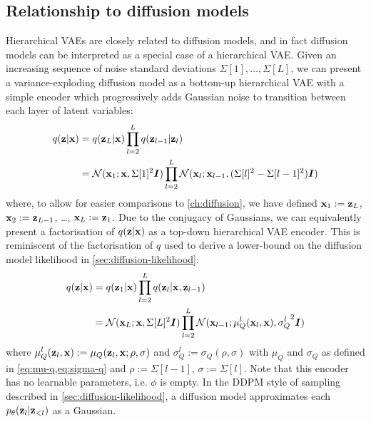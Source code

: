 \subsection{Relationship to diffusion models}
Hierarchical VAEs are closely related to diffusion models, and in fact diffusion models can be interpreted as a special case of a hierarchical VAE. Given an increasing sequence of noise standard deviations $\Sigma[1],\ldots,\Sigma[L]$, we can present a variance-exploding diffusion model as a bottom-up hierarchical VAE with a simple encoder which progressively adds Gaussian noise to transition between each layer of latent variables:
\begin{align}
    q({\mathbf{z}}|{\mathbf{x}}) &= q({\mathbf{z}}_L|{\mathbf{x}}) \prod_{l=2}^L q({\mathbf{z}}_{l-1} | {\mathbf{z}}_{l}) \\
    &= {\mathcal{N}}( {\mathbf{x}}_1 ; {\mathbf{x}}, \Sigma[1]^2 {\bm{I}} ) \prod_{l=2}^L {\mathcal{N}}( {\mathbf{x}}_{l} ; {\mathbf{x}}_{l-1}, (\Sigma[l]^2-\Sigma[l-1]^2) {\bm{I}} )
\end{align}
where, to allow for easier comparisons to \cref{ch:diffusion}, we have defined ${\mathbf{x}}_1 := {\mathbf{z}}_L$, ${\mathbf{x}}_2 := {\mathbf{z}}_{L-1}$, \ldots, ${\mathbf{x}}_L := {\mathbf{z}}_1$. Due to the conjugacy of Gaussians, we can equivalently present a factorisation of $q({\mathbf{z}}|{\mathbf{x}})$ as a top-down hierarchical VAE encoder. This is reminiscent of the factorisation of $q$ used to derive a lower-bound on the diffusion model likelihood in \cref{sec:diffusion-likelihood}:
\begin{align}
    q({\mathbf{z}}|{\mathbf{x}}) &= q({\mathbf{z}}_1|{\mathbf{x}}) \prod_{l=2}^L q({\mathbf{z}}_l | {\mathbf{x}}, {\mathbf{z}}_{l-1}) \\
    &= {\mathcal{N}}( {\mathbf{x}}_L ; {\mathbf{x}}, \Sigma[L]^2 {\bm{I}} ) \prod_{l=2}^L {\mathcal{N}}( {\mathbf{x}}_{l-1} ; \mu^l_Q({\mathbf{x}}_{l}, {\mathbf{x}}), {\sigma_Q^l}^2 {\bm{I}} )
\end{align}
where $\mu^l_Q({\mathbf{z}}_{l}, {\mathbf{x}}) := \mu_Q({\mathbf{z}}_{l}, {\mathbf{x}}; \rho, \sigma)$ and $\sigma^l_Q := \sigma_Q(\rho, \sigma)$ with $\mu_Q$ and $\sigma_Q$ as defined in \cref{eq:mu-q,eq:sigma-q} and $\rho := \Sigma[l-1]$, $\sigma := \Sigma[l]$. Note that this encoder has no learnable parameters, i.e. $\phi$ is empty. In the DDPM style of sampling described in \cref{sec:diffusion-likelihood}, a diffusion model approximates each $p_\theta({\mathbf{z}}_l|{\mathbf{z}}_{<l})$ as a Gaussian.

